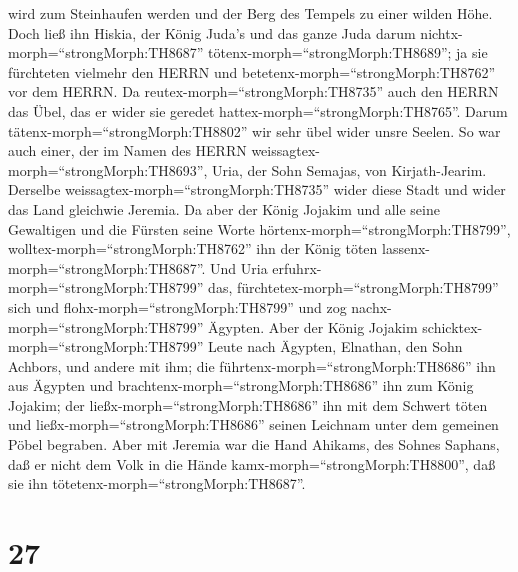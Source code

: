 wird zum Steinhaufen werden und der Berg des Tempels zu einer wilden
Höhe.  Doch ließ ihn Hiskia, der König Juda's und das ganze
Juda darum nichtx-morph=``strongMorph:TH8687''
tötenx-morph=``strongMorph:TH8689''; ja sie fürchteten vielmehr den
HERRN und betetenx-morph=``strongMorph:TH8762'' vor dem HERRN. Da
reutex-morph=``strongMorph:TH8735'' auch den HERRN das Übel, das er
wider sie geredet hattex-morph=``strongMorph:TH8765''. Darum
tätenx-morph=``strongMorph:TH8802'' wir sehr übel wider unsre Seelen.
 So war auch einer, der im Namen des HERRN
weissagtex-morph=``strongMorph:TH8693'', Uria, der Sohn Semajas, von
Kirjath-Jearim. Derselbe weissagtex-morph=``strongMorph:TH8735'' wider
diese Stadt und wider das Land gleichwie Jeremia.  Da aber
der König Jojakim und alle seine Gewaltigen und die Fürsten seine Worte
hörtenx-morph=``strongMorph:TH8799'',
wolltex-morph=``strongMorph:TH8762'' ihn der König töten
lassenx-morph=``strongMorph:TH8687''. Und Uria
erfuhrx-morph=``strongMorph:TH8799'' das,
fürchtetex-morph=``strongMorph:TH8799'' sich und
flohx-morph=``strongMorph:TH8799'' und zog
nachx-morph=``strongMorph:TH8799'' Ägypten.  Aber der König
Jojakim schicktex-morph=``strongMorph:TH8799'' Leute nach Ägypten,
Elnathan, den Sohn Achbors, und andere mit ihm;  die
führtenx-morph=``strongMorph:TH8686'' ihn aus Ägypten und
brachtenx-morph=``strongMorph:TH8686'' ihn zum König Jojakim; der
ließx-morph=``strongMorph:TH8686'' ihn mit dem Schwert töten und
ließx-morph=``strongMorph:TH8686'' seinen Leichnam unter dem gemeinen
Pöbel begraben.  Aber mit Jeremia war die Hand Ahikams, des
Sohnes Saphans, daß er nicht dem Volk in die Hände
kamx-morph=``strongMorph:TH8800'', daß sie ihn
tötetenx-morph=``strongMorph:TH8687''.

\hypertarget{section-26}{%
\section{27}\label{section-26}}

